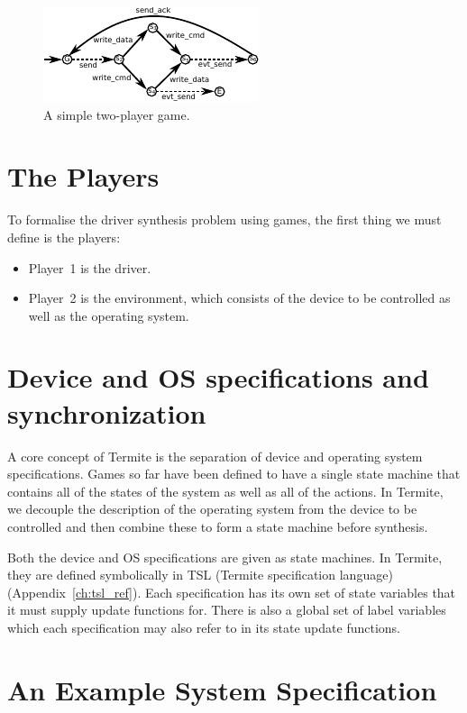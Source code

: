 \begin{figure}[t]
    \center
    \includegraphics[width=0.7\linewidth]{imgs/game.pdf}
    \caption{A simple two-player game.}
    \label{f:game}
\end{figure}

\section{The Players}

To formalise the driver synthesis problem using games, the first thing we must define is the players:

\begin{itemize}
    \item Player~1 is the driver. 
    \item Player~2 is the environment, which consists of the device to be controlled as well as the operating system.
\end{itemize}

\section{Device and OS specifications and synchronization}

A core concept of Termite is the separation of device and operating system specifications. Games so far have been defined to have a single state machine that contains all of the states of the system as well as all of the actions. In Termite, we decouple the description of the operating system from the device to be controlled and then combine these to form a state machine before synthesis.

Both the device and OS specifications are given as state machines. In Termite, they are defined symbolically in TSL (Termite specification language) (Appendix~\ref{ch:tsl_ref}). Each specification has its own set of state variables that it must supply update functions for. There is also a global set of label variables which each specification may also refer to in its state update functions. 

\section{An Example System Specification}

